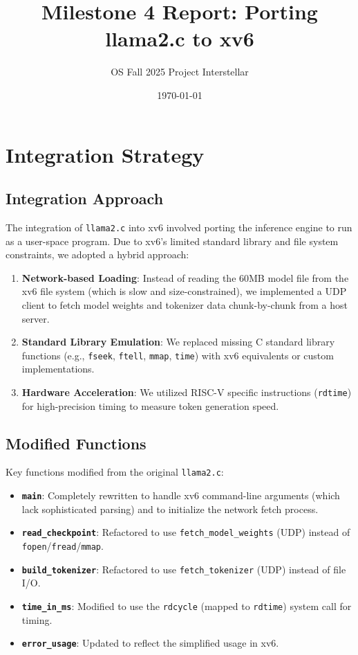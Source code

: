 \documentclass[12pt,a4paper]{article}
\title{Milestone 4 Report: Porting llama2.c to xv6}
\author{OS Fall 2025 Project Interstellar}
\date{\today}
\begin{document}
\maketitle

\section{Integration Strategy}

\subsection{Integration Approach}
The integration of \texttt{llama2.c} into xv6 involved porting the inference engine to run as a user-space program. Due to xv6's limited standard library and file system constraints, we adopted a hybrid approach:
\begin{enumerate}
    \item \textbf{Network-based Loading}: Instead of reading the 60MB model file from the xv6 file system (which is slow and size-constrained), we implemented a UDP client to fetch model weights and tokenizer data chunk-by-chunk from a host server.
    \item \textbf{Standard Library Emulation}: We replaced missing C standard library functions (e.g., \texttt{fseek}, \texttt{ftell}, \texttt{mmap}, \texttt{time}) with xv6 equivalents or custom implementations.
    \item \textbf{Hardware Acceleration}: We utilized RISC-V specific instructions (\texttt{rdtime}) for high-precision timing to measure token generation speed.
\end{enumerate}

\subsection{Modified Functions}
Key functions modified from the original \texttt{llama2.c}:
\begin{itemize}
    \item \textbf{\texttt{main}}: Completely rewritten to handle xv6 command-line arguments (which lack sophisticated parsing) and to initialize the network fetch process.
    \item \textbf{\texttt{read\_checkpoint}}: Refactored to use \texttt{fetch\_model\_weights} (UDP) instead of \texttt{fopen}/\texttt{fread}/\texttt{mmap}.
    \item \textbf{\texttt{build\_tokenizer}}: Refactored to use \texttt{fetch\_tokenizer} (UDP) instead of file I/O.
    \item \textbf{\texttt{time\_in\_ms}}: Modified to use the \texttt{rdcycle} (mapped to \texttt{rdtime}) system call for timing.
    \item \textbf{\texttt{error\_usage}}: Updated to reflect the simplified usage in xv6.
\end{itemize}
\end{document}

